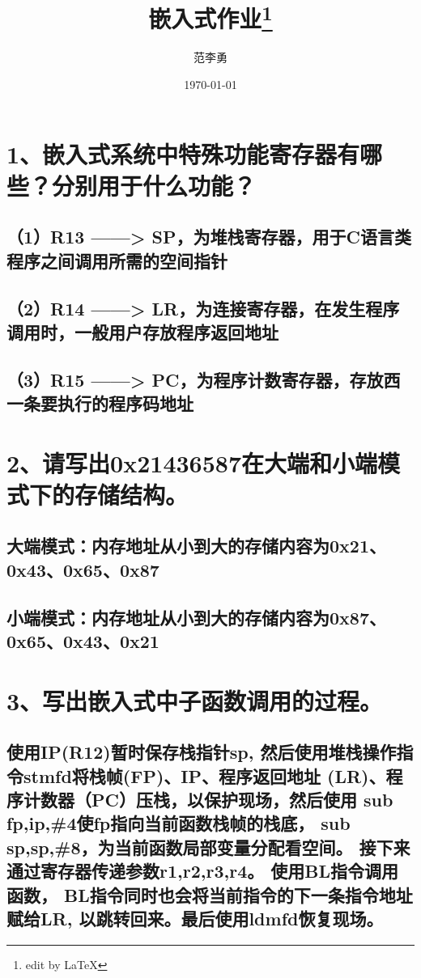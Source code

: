 \documentclass[12pt]{report}%
\title{\heiti 嵌入式作业\footnote{edit by \LaTeX}}
\author{\kaishu 范李勇}
\date{\today}
\begin{document}
\maketitle
\section*{1、嵌入式系统中特殊功能寄存器有哪些？分别用于什么功能？} 
\subsection*{（1）R13 ——> SP，为堆栈寄存器，用于C语言类程序之间调用所需的空间指针}
\subsection*{（2）R14 ——> LR，为连接寄存器，在发生程序调用时，一般用户存放程序返回地址}
\subsection*{（3）R15 ——> PC，为程序计数寄存器，存放西一条要执行的程序码地址}
\section*{2、请写出0x21436587在大端和小端模式下的存储结构。}
\subsection*{大端模式：内存地址从小到大的存储内容为0x21、0x43、0x65、0x87}
\subsection*{小端模式：内存地址从小到大的存储内容为0x87、0x65、0x43、0x21}
\section*{3、写出嵌入式中子函数调用的过程。}
\subsection*
{\heiti 使用IP(R12)暂时保存栈指针sp,
然后使用堆栈操作指令stmfd将栈帧(FP)、IP、程序返回地址
(LR)、程序计数器（PC）压栈，以保护现场，然后使用
sub fp,ip,\#4使fp指向当前函数栈帧的栈底，
sub sp,sp,\#8，为当前函数局部变量分配看空间。
接下来通过寄存器传递参数r1,r2,r3,r4。
使用BL指令调用函数，
BL指令同时也会将当前指令的下一条指令地址赋给LR,
以跳转回来。最后使用ldmfd恢复现场。}
\end{document}
